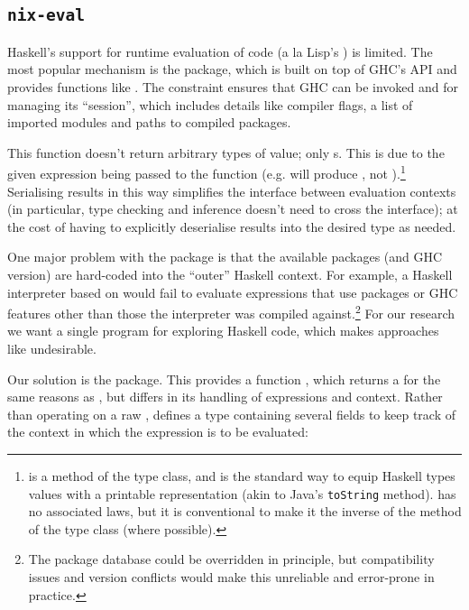 \subsection{\texttt{nix-eval}}

Haskell's support for runtime evaluation of code (a la Lisp's \eval) is
limited. The most popular mechanism is the \hint package, which is built
on top of GHC's API and provides functions like
. The 
constraint ensures that GHC can be invoked and for managing its ``session'',
which includes details like compiler flags, a list of imported modules and paths
to compiled packages.

This function doesn't return arbitrary types of value; only s. This
is due to the given expression being passed to the  function (e.g.
 will produce , not
).\footnote{ is a method of the
   type class, and is the standard way to equip Haskell types values
  with a printable representation (akin to Java's \texttt{toString} method).
   has no associated laws, but it is conventional to make it the
  inverse of the  method of the  type
  class (where possible).} Serialising results in this way simplifies the
interface between evaluation contexts (in particular, type checking and
inference doesn't need to cross the interface); at the cost of having to
explicitly deserialise results into the desired type as needed.

One major problem with the \hint package is that the available packages
(and GHC version) are hard-coded into the ``outer'' Haskell context. For
example, a Haskell interpreter based on \hint would fail to evaluate
expressions that use packages or GHC features other than those the interpreter
was compiled against.\footnote{The package database could be overridden in
  principle, but compatibility issues and version conflicts would make this
  unreliable and error-prone in practice.} For our research we want a single
program for exploring  Haskell code, which makes approaches like
\hint undesirable.

Our solution is the \nixeval package. This provides a function
, which returns a  for the same
reasons as \hint, but differs in its handling of expressions and context. Rather
than operating on a raw , \nixeval defines a type 
containing several fields to keep track of the context in which the expression
is to be evaluated:

